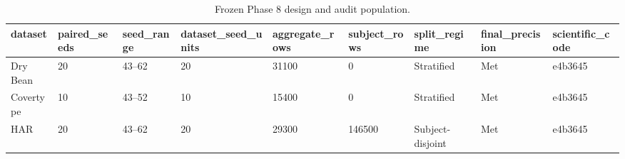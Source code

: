 \begin{table}[t]
\centering
\caption{Frozen Phase 8 design and audit population.}
\label{tab:design-audit}
\begin{tabular}{lllllllll}
\hline
dataset & paired\_seeds & seed\_range & dataset\_seed\_units & aggregate\_rows & subject\_rows & split\_regime & final\_precision & scientific\_code \\
\hline
Dry Bean & 20 & 43–62 & 20 & 31100 & 0 & Stratified & Met & e4b3645 \\
Covertype & 10 & 43–52 & 10 & 15400 & 0 & Stratified & Met & e4b3645 \\
HAR & 20 & 43–62 & 20 & 29300 & 146500 & Subject-disjoint & Met & e4b3645 \\
\hline
\end{tabular}
\end{table}
